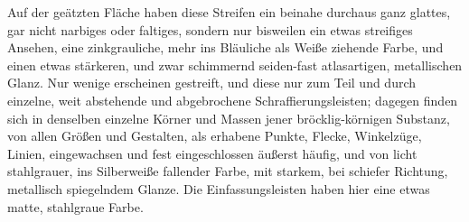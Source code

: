 \documentclass[a4paper, 11pt, oneside, german]{article}
\begin{document}
Auf der geätzten Fläche haben diese Streifen ein beinahe durchaus ganz glattes, gar nicht narbiges oder faltiges, sondern nur bisweilen ein etwas streifiges Ansehen, eine zinkgrauliche, mehr ins Bläuliche als Weiße ziehende Farbe, und einen etwas stärkeren, und zwar schimmernd seiden-fast atlasartigen, metallischen Glanz. Nur wenige erscheinen gestreift, und diese nur zum Teil und durch einzelne, weit abstehende und abgebrochene Schraffierungsleisten; dagegen finden sich in denselben einzelne Körner und Massen jener bröcklig-körnigen Substanz, von allen Größen und Gestalten, als erhabene Punkte, Flecke, Winkelzüge, Linien, eingewachsen und fest eingeschlossen äußerst häufig, und von licht stahlgrauer, ins Silberweiße fallender Farbe, mit starkem, bei schiefer Richtung, metallisch spiegelndem Glanze. Die Einfassungsleisten haben hier eine etwas matte, stahlgraue Farbe.
\end{document}
